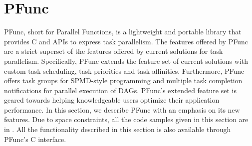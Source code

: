 \documentclass{sig-alternate}
\begin{document}
\section{PFunc}
\label{sec:pfunc}

PFunc, short for Parallel Functions, is a lightweight and portable library that
provides C and \Cpp{} APIs to express task parallelism. The features offered by
PFunc are a strict superset of the features offered by current solutions for
task parallelism.  Specifically, PFunc extends the feature set of current
solutions with custom task scheduling, task priorities and task affinities.
Furthermore, PFunc offers task groups for SPMD-style programming and multiple
task completion notifications for parallel execution of DAGs.  PFunc's extended
feature set is geared towards helping knowledgeable users optimize their
application performance. In this section, we describe PFunc with an emphasis on
its new features.  Due to space constraints, all the code samples given in this
section are in \Cpp{}. All the functionality described in this section is also
available through PFunc's C interface.

\end{document}
